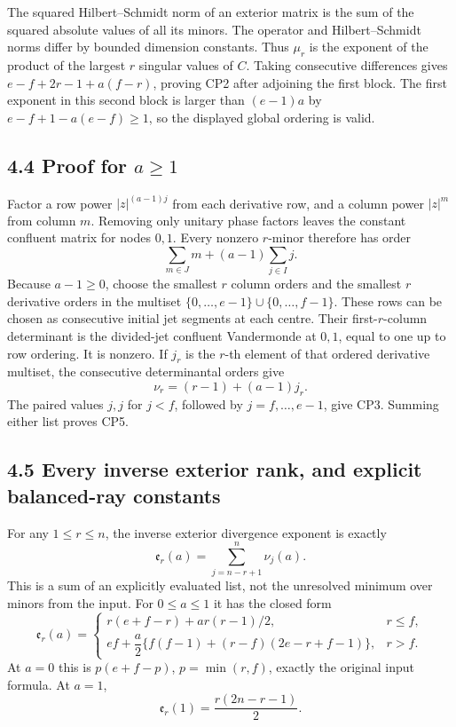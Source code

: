 \documentclass[
  11pt,
]{article}
\begin{document}
The squared Hilbert--Schmidt norm of an exterior matrix is the sum of
the squared absolute values of all its minors. The operator and
Hilbert--Schmidt norms differ by bounded dimension constants. Thus
\(\mu_r\) is the exponent of the product of the largest \(r\) singular
values of \(C\). Taking consecutive differences gives
\(e-f+2r-1+a(f-r)\), proving CP2 after adjoining the first block. The
first exponent in this second block is larger than \((e-1)a\) by
\(e-f+1-a(e-f)\ge1\), so the displayed global ordering is valid.

\subsection{\texorpdfstring{4.4 Proof for
\(a\ge1\)}{4.4 Proof for a\textbackslash ge1}}\label{proof-for-age1}

Factor a row power \(|z|^{(a-1)j}\) from each derivative row, and a
column power \(|z|^m\) from column \(m\). Removing only unitary phase
factors leaves the constant confluent matrix for nodes \(0,1\). Every
nonzero \(r\)-minor therefore has order \[
\sum_{m\in J}m+(a-1)\sum_{j\in I}j.
\] Because \(a-1\ge0\), choose the smallest \(r\) column orders and the
smallest \(r\) derivative orders in the multiset
\(\{0,\ldots,e-1\}\cup\{0,\ldots,f-1\}\). These rows can be chosen as
consecutive initial jet segments at each centre. Their
first-\(r\)-column determinant is the divided-jet confluent Vandermonde
at \(0,1\), equal to one up to row ordering. It is nonzero. If \(j_r\)
is the \(r\)-th element of that ordered derivative multiset, the
consecutive determinantal orders give \[
\nu_r=(r-1)+(a-1)j_r.
\] The paired values \(j,j\) for \(j<f\), followed by
\(j=f,\ldots,e-1\), give CP3. Summing either list proves CP5.

\subsection{4.5 Every inverse exterior rank, and explicit balanced-ray
constants}\label{every-inverse-exterior-rank-and-explicit-balanced-ray-constants}

For any \(1\le r\le n\), the inverse exterior divergence exponent is
exactly \[
\boxed{\mathfrak e_r(a)=\sum_{j=n-r+1}^{n}\nu_j(a).} \tag{CP9}
\] This is a sum of an explicitly evaluated list, not the unresolved
minimum over minors from the input. For \(0\le a\le1\) it has the closed
form \[
\mathfrak e_r(a)=
\begin{cases}
r(e+f-r)+ar(r-1)/2,&r\le f,\\
ef+\dfrac a2\{f(f-1)+(r-f)(2e-r+f-1)\},&r>f.
\end{cases} \tag{CP10}
\] At \(a=0\) this is \(p(e+f-p)\), \(p=\min(r,f)\), exactly the
original input formula. At \(a=1\), \[
\mathfrak e_r(1)=\frac{r(2n-r-1)}2.
\]
\end{document}
